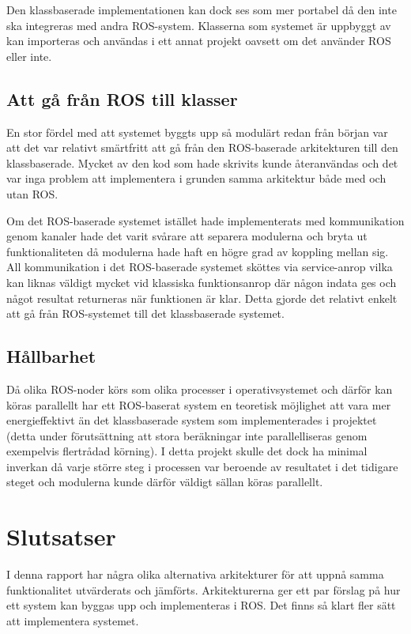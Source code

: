 Den klassbaserade implementationen kan dock ses som mer portabel då den inte ska integreras med andra ROS-system. Klasserna som systemet är uppbyggt av kan importeras och användas i ett annat projekt oavsett om det använder ROS eller inte.

\subsection{Att gå från ROS till klasser}
En stor fördel med att systemet byggts upp så modulärt redan från början var att det var relativt smärtfritt att gå från den ROS-baserade arkitekturen till den klassbaserade. Mycket av den kod som hade skrivits kunde återanvändas och det var inga problem att implementera i grunden samma arkitektur både med och utan ROS.

Om det ROS-baserade systemet istället hade implementerats med kommunikation genom kanaler hade det varit svårare att separera modulerna och bryta ut funktionaliteten då modulerna hade haft en högre grad av koppling mellan sig. All kommunikation i det ROS-baserade systemet sköttes via service-anrop vilka kan liknas väldigt mycket vid klassiska funktionsanrop där någon indata ges och något resultat returneras när funktionen är klar. Detta gjorde det relativt enkelt att gå från ROS-systemet till det klassbaserade systemet.

\subsection{Hållbarhet}
Då olika ROS-noder körs som olika processer i operativsystemet och därför kan köras parallellt har ett ROS-baserat system en teoretisk möjlighet att vara mer energieffektivt än det klassbaserade system som implementerades i projektet (detta under förutsättning att stora beräkningar inte parallelliseras genom exempelvis flertrådad körning). I detta projekt skulle det dock ha minimal inverkan då varje större steg i processen var beroende av resultatet i det tidigare steget och modulerna kunde därför väldigt sällan köras parallellt.


\section{Slutsatser}
\label{sec:conclusions-lundberg}

I denna rapport har några olika alternativa arkitekturer för att uppnå samma funktionalitet utvärderats och jämförts. Arkitekturerna ger ett par förslag på hur ett system kan byggas upp och implementeras i ROS. Det finns så klart fler sätt att implementera systemet.

